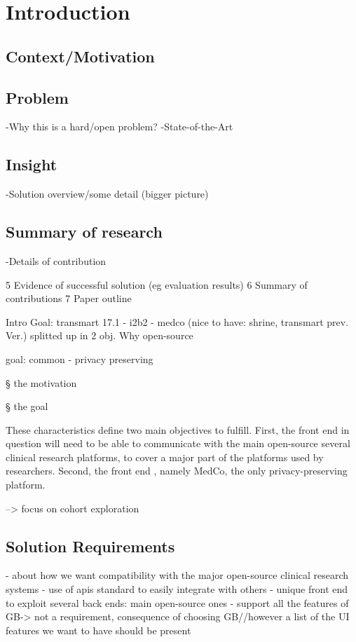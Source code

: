 \chapter{Introduction}
\section{Context/Motivation}


\section{Problem}
-Why this is a hard/open problem?
-State-of-the-Art

\section{Insight}
-Solution overview/some detail (bigger picture)

\section{Summary of research}
-Details of contribution

5 Evidence of successful solution (eg evaluation results)
6 Summary of contributions
7 Paper outline

Intro
Goal: transmart 17.1 - i2b2 - medco (nice to have: shrine, transmart prev. Ver.)
splitted up in 2 obj.
Why open-source

goal: common - privacy preserving

§ the motivation

§ the goal

These characteristics define two main objectives to fulfill. 
First, the front end in question will need to be able to communicate with the main open-source several clinical research platforms, to cover a major part of the platforms used by researchers.
Second, the front end , namely MedCo, the only privacy-preserving platform.

--> focus on cohort exploration

\section{Solution Requirements}
\label{sec:requirements}
- about how we want compatibility with the major open-source clinical research systems
- use of apis standard to easily integrate with others
- unique front end to exploit several back ends: main open-source ones
- support all the features of GB-> not a requirement, consequence of choosing GB//however a list of the UI features we want to have should be present


